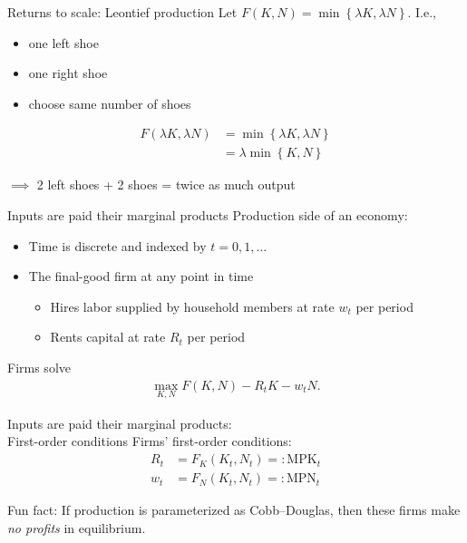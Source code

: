 \documentclass[presentation,dvipsnames]{beamer}
\begin{document}
\begin{frame}[label=sec-2-6]{Returns to scale: Leontief production}
Let $F(K,N) = \min \left\{ \lambda K, \lambda N \right\}$. I.e.,
\begin{itemize}[label={--}]
\item one left shoe
\item one right shoe
\item choose same number of shoes
\end{itemize}

\begin{align*}
F(\lambda K, \lambda N) &= \min \left\{ \lambda K, \lambda N \right\} \\
&= \lambda \min \left\{ K,N \right\}
\end{align*}

$\implies$ 2 left shoes + 2 shoes = twice as much output
\end{frame}

\begin{frame}[label=sec-2-7]{Inputs are paid their marginal products}
Production side of an economy:
\begin{itemize}[label={--}]
\item Time is discrete and indexed by $t=0,1,\dots$
\item The final-good firm at any point in time
\begin{itemize}[label={--}]
\item Hires labor supplied by household members at rate $w_{t}$ per period
\item Rents capital at rate $R_{t}$ per period 
\end{itemize}
\end{itemize}

Firms solve
\begin{align*}
\max_{K,N} F(K,N) - R_{t}K - w_{t}N.
\end{align*}
\end{frame}

\begin{frame}[label=sec-2-7]{Inputs are paid their marginal products: \\ First-order conditions}
Firms' first-order conditions:
\begin{align*}
R_{t} &= F_{K}(K_{t},N_{t}) =: \text{MPK}_{t} \\
w_{t} &= F_{N}(K_{t},N_{t}) =: \text{MPN}_{t}
\end{align*}

\textcolor{RubineRed}{Fun fact}: If production is parameterized as Cobb--Douglas,
then these firms make \emph{no profits} in equilibrium.
\end{frame}
\end{document}
